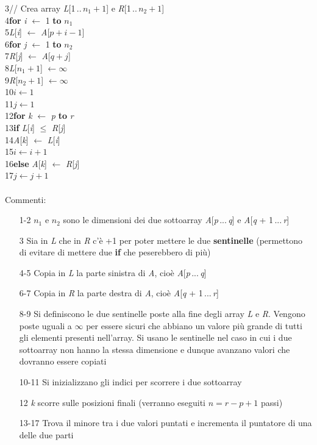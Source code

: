 \documentclass[10pt, a4paper]{report}
\newcommand\firsttab[1][0.5cm]{\hspace*{#1}}
\newcommand\secondtab[1][1cm]{\hspace*{#1}}
\newcommand\thirdtab[1][1.5cm]{\hspace*{#1}}
\begin{document}
3\firsttab // Crea array \textit{L}[1\,..\,$n_1 + 1$] e \textit{R}[1\,..\,$n_2 + 1$]\\
4\firsttab \textbf{for} \textit{i} $\leftarrow$ 1 \textbf{to} $n_1$\\
5\secondtab \textit{L}[\textit{i}] $\leftarrow$ \textit{A}[$p + i - 1$]\\
6\firsttab  \textbf{for} \textit{j} $\leftarrow$ 1 \textbf{to} $n_2$\\
7\secondtab \textit{R}[\textit{j}] $\leftarrow$ \textit{A}[$q + j$]\\
8\firsttab \textit{L}[$n_1 + 1$] $\leftarrow \infty $\\
9\firsttab \textit{R}[$n_2 + 1$] $\leftarrow \infty $\\
10\firsttab $i \leftarrow 1$\\
11\firsttab $j \leftarrow 1$\\
12\firsttab  \textbf{for} \textit{k} $\leftarrow$ \textit{p} \textbf{to} \textit{r}\\
13\secondtab \textbf{if} \textit{L}[\textit{i}] $\leq$ \textit{R}[\textit{j}]\\
14\thirdtab \textit{A}[\textit{k}] $\leftarrow$ \textit{L}[\textit{i}]\\
15\thirdtab $i \leftarrow i + 1$\\
16\secondtab \textbf{else} \textit{A}[\textit{k}] $\leftarrow$ \textit{R}[\textit{j}]\\
17\thirdtab $j \leftarrow j + 1$\\\\
Commenti:
\begin{enumerate}
\item[1-2]$n_1$ e $n_2$ sono le dimensioni dei due sottoarray \textit{A}[\textit{p}\,...\,\textit{q}] e \textit{A}[\textit{q} + 1\,...\,\textit{r}]
\item[3]Sia in \textit{L} che in \textit{R} c'è +1 per poter mettere le due \textbf{sentinelle} (permettono di evitare di mettere due \textbf{if} che peserebbero di più)
\item[4-5]Copia in \textit{L} la parte sinistra di \textit{A}, cioè \textit{A}[\textit{p}\,...\,\textit{q}]
\item[6-7]Copia in \textit{R} la parte destra di \textit{A}, cioè \textit{A}[\textit{q} + 1\,...\,\textit{r}]
\item[8-9]Si definiscono le due sentinelle poste alla fine degli array \textit{L} e \textit{R}. Vengono poste uguali a $\infty$ per essere sicuri che abbiano un valore più grande di tutti gli elementi presenti nell'array. Si usano le sentinelle nel caso in cui i due sottoarray non hanno la stessa dimensione e dunque avanzano valori che dovranno essere copiati
\item[10-11]Si inizializzano gli indici per scorrere i due sottoarray
\item[12]\textit{k} scorre sulle posizioni finali (verranno eseguiti $n = r - p +1$ passi)
\item[13-17]Trova il minore tra i due valori puntati e incrementa il puntatore di una delle due parti
\end{enumerate}
\end{document}
